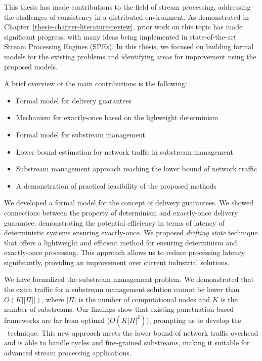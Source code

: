 This thesis has made contributions to the field of stream processing, addressing the challenges of consistency in a distributed environment. As demonstrated in Chapter~\ref{thesis-chapter-literature-review}, prior work on this topic has made significant progress, with many ideas being implemented in state-of-the-art Stream Processing Engines (SPEs). In this thesis, we focused on building formal models for the existing problems and identifying areas for improvement using the proposed models. 

A brief overview of the main contributions is the following:
\begin{itemize}
    \item Formal model for delivery guarantees
    \item Mechanism for exactly-once based on the lighweight determinism
    \item Formal model for substream management
    \item Lower bound estimation for network traffic in substream management 
    \item Substream management approach reaching the lower bound of network traffic
    \item A demonstration of practical feasibility of the proposed methods
\end{itemize}

We developed a formal model for the concept of delivery guarantees. We showed connections between the property of determinism and exactly-once delivery guarantee, demonstrating the potential efficiency in terms of latency of deterministic systems ensuring exactly-once. We proposed {\em drifting state} technique that offers a lightweight and efficient method for ensuring determinism and exactly-once processing. This approach allows us to reduce processing latency significantly, providing an improvement over current industrial solutions.

We have formalized the substream management problem. We demonstrated that the extra traffic for a substream management solution cannot be lower than $O(K||\Pi||)$, where $|\Pi|$ is the number of computational nodes and $K$ is the number of substreams. Our findings show that existing punctuation-based frameworks are far from optimal ($O(K|\Pi|^2)$), prompting us to develop the \tracker\ technique. This new approach meets the lower bound of network traffic overhead and is able to handle cycles and fine-grained substreams, making it suitable for advanced stream processing applications.


